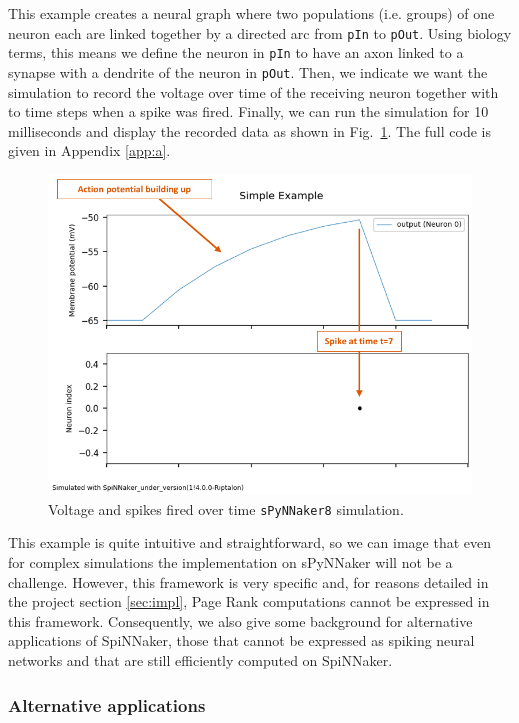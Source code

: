 This example creates a neural graph where two populations (i.e. groups) of one neuron each are linked together by a directed arc from \texttt{pIn} to \texttt{pOut}. Using biology terms, this means we define the neuron in \texttt{pIn} to have an axon linked to a synapse with a dendrite of the neuron in \texttt{pOut}. Then, we indicate we want the simulation to record the voltage over time of the receiving neuron together with to time steps when a spike was fired. Finally, we can run the simulation for 10 milliseconds and display the recorded data as shown in Fig.~\ref{fig:simple_spynnaker8}. The full code is given in Appendix \ref{app:a}.

\vspace{-0.1cm}
\begin{figure}[hbtp]
\centering
\includegraphics[width = 0.8\hsize]{figures/simple_spynnaker8.png}
\caption{Voltage and spikes fired over time \texttt{sPyNNaker8} simulation.}
\label{fig:simple_spynnaker8}
\end{figure}

This example is quite intuitive and straightforward, so we can image that even for complex simulations the implementation on sPyNNaker will not be a challenge. However, this framework is very specific and, for reasons detailed in the project section \ref{sec:impl}, Page Rank computations cannot be expressed in this framework. Consequently, we also give some background for alternative applications of SpiNNaker, those that cannot be expressed as spiking neural networks and that are still efficiently computed on SpiNNaker. \\

\subsubsection{Alternative applications} \label{sec:aa}

